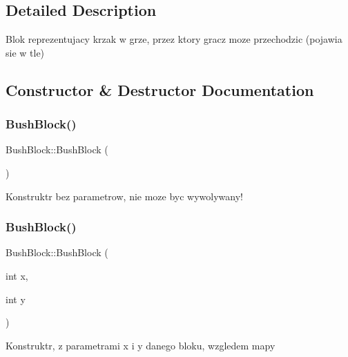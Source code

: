 \subsection{Detailed Description}
Blok reprezentujacy krzak w grze, przez ktory gracz moze przechodzic (pojawia sie w tle) 

\subsection{Constructor \& Destructor Documentation}
\mbox{\label{class_bush_block_a866cb791101f70cd89795b0de45c041b}} 
\subsubsection{\texorpdfstring{Bush\+Block()}{BushBlock()}\hspace{0.1cm}{\footnotesize\ttfamily [1/2]}}
{\footnotesize\ttfamily Bush\+Block\+::\+Bush\+Block (\begin{DoxyParamCaption}{ }\end{DoxyParamCaption})}

Konstruktr bez parametrow, nie moze byc wywolywany! \mbox{\label{class_bush_block_a27d102ac30e12c537e6a8de34ce50779}} 
\subsubsection{\texorpdfstring{Bush\+Block()}{BushBlock()}\hspace{0.1cm}{\footnotesize\ttfamily [2/2]}}
{\footnotesize\ttfamily Bush\+Block\+::\+Bush\+Block (\begin{DoxyParamCaption}\item[{int}]{x,  }\item[{int}]{y }\end{DoxyParamCaption})}

Konstruktr, z parametrami x i y danego bloku, wzgledem mapy \mbox{\label{class_bush_block_acffc1c20ebfc301e3c9b99912b20c5e2}} 
